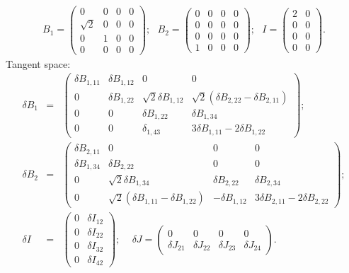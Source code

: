\documentclass[a4paper,12pt]{article}
\begin{document}
\begin{eqnarray}
B_1=\left(\begin{array}{cccc} 0 & 0 & 0 & 0 \\ \sqrt{2} & 0 & 0 & 0 \\ 0 & 1 & 0 & 0 \\
0 & 0 & 0 & 0
\end{array}\right); \, \, \, \,
B_2=\left(\begin{array}{cccc} 0 & 0 & 0 & 0 \\ 0 & 0 & 0 & 0 \\ 0 & 0 & 0 & 0 \\
1 & 0 & 0 & 0
\end{array}\right);
\, \, \, \, I=\left(\begin{array}{cc} 2 & 0 \\ 0 & 0 \\0 & 0 \\ 0 & 0
\end{array}\right).
\end{eqnarray}
Tangent space:
\begin{eqnarray}
\delta B_1 &=& \left(\begin{array}{cccc} \delta B_{1,11} & \delta B_{1,12} & 0 & 0 \\
0 & \delta B_{1,22} & \sqrt{2}\delta B_{1,12} & \sqrt{2} \left(\delta B_{2,22} -\delta B_{2,11} \right) \\ 0 & 0
& \delta B_{1,22} & \delta B_{1,34} \\ 0 & 0 & \delta_{1,43} & 3 \delta B_{1,11}-2 \delta B_{1,22}
\end{array}\right); \nonumber \\
\delta B_2 &=& \left(\begin{array}{cccc} \delta B_{2,11} & 0 & 0 & 0 \\ \delta B_{1,34} & \delta B_{2,22} & 0 & 0 \\
0 & \sqrt{2} \delta B_{1,34} & \delta B_{2,22} & \delta B_{2,34} \\
0 & \sqrt{2}\left( \delta B_{1,11}-\delta B_{1,22}\right) & -\delta B_{1,12} & 3 \delta B_{2,11}-2 \delta
B_{2,22}
\end{array}\right); \nonumber \\
\delta I &=& \left(\begin{array}{cc} 0 & \delta I_{12} \\ 0 & \delta I_{22} \\ 0 & \delta I_{32} \\ 0 & \delta
I_{42}
\end{array}\right); \, \, \, \, \, \, \,
\delta J=\left(\begin{array}{cccc} 0 & 0 & 0 & 0 \\ \delta J_{21} & \delta J_{22} & \delta J_{23} & \delta
J_{24}
\end{array}\right).
\end{eqnarray}
\end{document}
